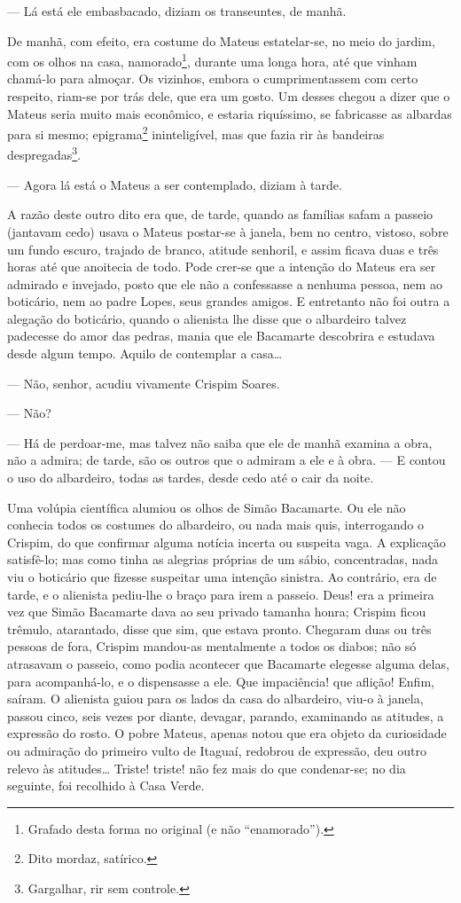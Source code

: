 --- Lá está ele embasbacado, diziam os transeuntes, de manhã.

De manhã, com efeito, era costume do Mateus estatelar-se, no meio do
jardim, com os olhos na casa, namorado\footnote{Grafado desta forma no
  original (e não ``enamorado'').}, durante uma longa hora, até que
vinham chamá-lo para almoçar. Os vizinhos, embora o cumprimentassem com
certo respeito, riam-se por trás dele, que era um gosto. Um desses
chegou a dizer que o Mateus seria muito mais econômico, e estaria
riquíssimo, se fabricasse as albardas para si mesmo; epigrama\footnote{Dito
  mordaz, satírico.} ininteligível, mas que fazia rir às bandeiras
despregadas\footnote{Gargalhar, rir sem controle.}.

--- Agora lá está o Mateus a ser contemplado, diziam à tarde.

A razão deste outro dito era que, de tarde, quando as famílias safam a
passeio (jantavam cedo) usava o Mateus postar-se à janela, bem no
centro, vistoso, sobre um fundo escuro, trajado de branco, atitude
senhoril, e assim ficava duas e três horas até que anoitecia de todo.
Pode crer-se que a intenção do Mateus era ser admirado e invejado, posto
que ele não a confessasse a nenhuma pessoa, nem ao boticário, nem ao
padre Lopes, seus grandes amigos. E entretanto não foi outra a alegação
do boticário, quando o alienista lhe disse que o albardeiro talvez
padecesse do amor das pedras, mania que ele Bacamarte descobrira e
estudava desde algum tempo. Aquilo de contemplar a casa\ldots{}

--- Não, senhor, acudiu vivamente Crispim Soares.

--- Não?

--- Há de perdoar-me, mas talvez não saiba que ele de manhã examina a
obra, não a admira; de tarde, são os outros que o admiram a ele e à
obra. --- E contou o uso do albardeiro, todas as tardes, desde cedo até
o cair da noite.

Uma volúpia científica alumiou os olhos de Simão Bacamarte. Ou ele não
conhecia todos os costumes do albardeiro, ou nada mais quis,
interrogando o Crispim, do que confirmar alguma notícia incerta ou
suspeita vaga. A explicação satisfê-lo; mas como tinha as alegrias
próprias de um sábio, concentradas, nada viu o boticário que fizesse
suspeitar uma intenção sinistra. Ao contrário, era de tarde, e o
alienista pediu-lhe o braço para irem a passeio. Deus! era a primeira
vez que Simão Bacamarte dava ao seu privado tamanha honra; Crispim ficou
trêmulo, atarantado, disse que sim, que estava pronto. Chegaram duas ou
três pessoas de fora, Crispim mandou-as mentalmente a todos os diabos;
não só atrasavam o passeio, como podia acontecer que Bacamarte elegesse
alguma delas, para acompanhá-lo, e o dispensasse a ele. Que impaciência!
que aflição! Enfim, saíram. O alienista guiou para os lados da casa do
albardeiro, viu-o à janela, passou cinco, seis vezes por diante,
devagar, parando, examinando as atitudes, a expressão do rosto. O pobre
Mateus, apenas notou que era objeto da curiosidade ou admiração do
primeiro vulto de Itaguaí, redobrou de expressão, deu outro relevo às
atitudes\ldots{} Triste! triste! não fez mais do que condenar-se; no dia
seguinte, foi recolhido à Casa Verde.

